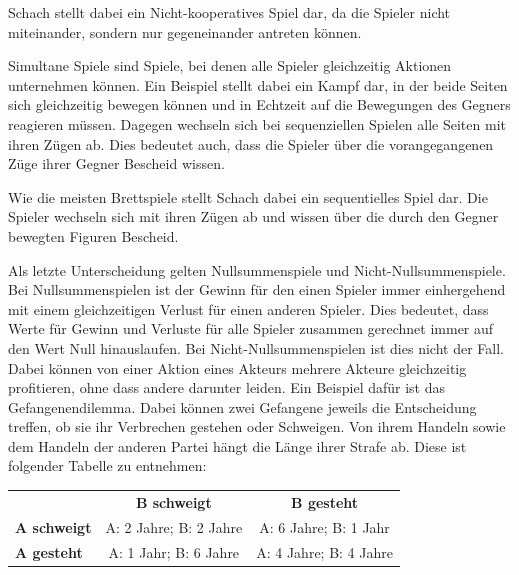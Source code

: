 
Schach stellt dabei ein Nicht-kooperatives Spiel dar, da die Spieler nicht miteinander, sondern nur gegeneinander antreten können.

Simultane Spiele sind Spiele, bei denen alle Spieler gleichzeitig Aktionen unternehmen können. Ein Beispiel stellt dabei ein Kampf dar, in der beide Seiten sich gleichzeitig bewegen können und in Echtzeit auf die Bewegungen des Gegners reagieren müssen. Dagegen wechseln sich bei sequenziellen Spielen  alle Seiten mit ihren Zügen ab. Dies bedeutet auch, dass die Spieler über die vorangegangenen Züge ihrer Gegner Bescheid wissen. \cite{Rodriguez}

Wie die meisten Brettspiele stellt Schach dabei ein sequentielles Spiel dar. Die Spieler wechseln sich mit ihren Zügen ab und wissen über die durch den Gegner bewegten Figuren Bescheid.

Als letzte Unterscheidung gelten Nullsummenspiele und Nicht-Nullsummenspiele. Bei Nullsummenspielen ist der Gewinn für den einen Spieler immer einhergehend mit einem gleichzeitigen Verlust für einen anderen Spieler. Dies bedeutet, dass Werte für Gewinn und Verluste für alle Spieler zusammen gerechnet immer auf den Wert Null hinauslaufen. Bei Nicht-Nullsummenspielen ist dies nicht der Fall. Dabei können von einer Aktion eines Akteurs mehrere Akteure gleichzeitig profitieren, ohne dass andere darunter leiden.\cite{Rodriguez} Ein Beispiel dafür ist das Gefangenendilemma. Dabei können zwei Gefangene jeweils die Entscheidung treffen, ob sie ihr Verbrechen gestehen oder Schweigen. Von ihrem Handeln sowie dem Handeln der anderen Partei hängt die Länge ihrer Strafe ab. \cite{Tweedale1993} Diese ist folgender Tabelle zu entnehmen:

\begin{tabular}{l c c}
& \textbf{B schweigt} & \textbf{B gesteht} \\
\textbf{A schweigt} & A: 2 Jahre; B: 2 Jahre & A: 6 Jahre; B: 1 Jahr \\
\textbf{A gesteht} & A: 1 Jahr; B: 6 Jahre & A: 4 Jahre; B: 4 Jahre
\end{tabular}



